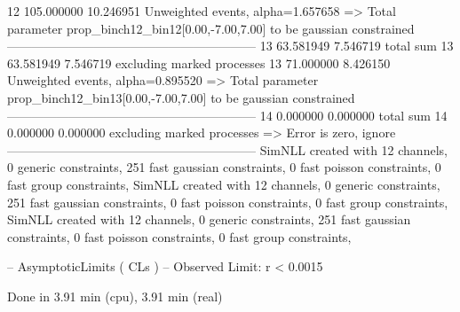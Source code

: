 12         105.000000      10.246951       Unweighted events, alpha=1.657658
  => Total parameter prop_binch12_bin12[0.00,-7.00,7.00] to be gaussian constrained
------------------------------------------------------------
13         63.581949       7.546719        total sum                     
13         63.581949       7.546719        excluding marked processes    
13         71.000000       8.426150        Unweighted events, alpha=0.895520
  => Total parameter prop_binch12_bin13[0.00,-7.00,7.00] to be gaussian constrained
------------------------------------------------------------
14         0.000000        0.000000        total sum                     
14         0.000000        0.000000        excluding marked processes    
  => Error is zero, ignore      
------------------------------------------------------------
SimNLL created with 12 channels, 0 generic constraints, 251 fast gaussian constraints, 0 fast poisson constraints, 0 fast group constraints, 
SimNLL created with 12 channels, 0 generic constraints, 251 fast gaussian constraints, 0 fast poisson constraints, 0 fast group constraints, 
SimNLL created with 12 channels, 0 generic constraints, 251 fast gaussian constraints, 0 fast poisson constraints, 0 fast group constraints, 

 -- AsymptoticLimits ( CLs ) --
Observed Limit: r < 0.0015

Done in 3.91 min (cpu), 3.91 min (real)
